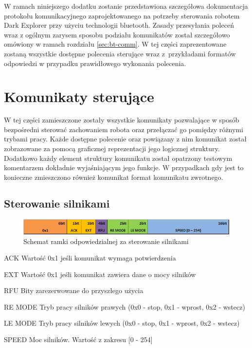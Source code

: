 W ramach niniejszego dodatku zostanie przedstawiona szczegółowa dokumentacja
protokołu komunikacyjnego zaprojektowanego na potrzeby sterowania robotem Dark
Explorer przy użyciu technologii bluetooth. Zasady przesyłania
poleceń wraz z ogólnym zarysem sposobu podziału komunikatów został szczegółowo
omówiony w ramach rozdziału \ref{sec:bt-comm}. W tej części zaprezentowane
zostaną wszystkie dostępne polecenia sterujące wraz z~przykładami
formatów odpowiedzi w przypadku prawidłowego wykonania polecenia.

\section{Komunikaty sterujące}
W tej części zamieszczone zostały wszystkie komunikaty pozwalające w
sposób bezpośredni sterować zachowaniem robota oraz przełączać go pomiędzy
różnymi trybami pracy. Każde dostępne polecenie oraz powiązany z nim
komunikat został zobrazowane za pomocą graficznej reprezentacji jego logicznej
struktury. Dodatkowo każdy element struktury komunikatu został opatrzony
testowym komentarzem dokładnie wyjaśniającym jego funkcje. W przypadkach gdy jest to
konieczne zmieszczono również komunikat format komunikatu zwrotnego.

\subsection{Sterowanie silnikami}
\begin{figure}[h!]
 \centering
 \includegraphics[width=\textwidth]{../images/appendix/cmd_0x01.png}
 \caption{Schemat ramki odpowiedzialnej za sterowanie silnikami} 
 \label{fig:CMD_0x01}
\end{figure}

\begin{basedescript}{\desclabelstyle{\pushlabel}\desclabelwidth{25mm}}
\setlength{\parsep}{0pt}
\setlength{\itemsep}{0mm}
\setlength{\parskip}{0pt}
\item[ACK]
	Wartość 0x1 jeśli komunikat wymaga potwierdzenia
\item[EXT] 
	Wartość 0x1 jeśli komunikat zawiera dane o mocy silników
\item[RFU] 
	Bity zarezerwowane do przyszłego użycia
\item[RE MODE] 
	Tryb pracy silników prawych (0x0 - stop, 0x1 - wprost, 0x2 - wstecz)
\item[LE MODE] 
	Tryb pracy silników lewych (0x0 - stop, 0x1 - wprost, 0x2 - wstecz)
\item[SPEED] 
	Moc silników. Wartość z zakresu [0 - 254]
\end{basedescript}

